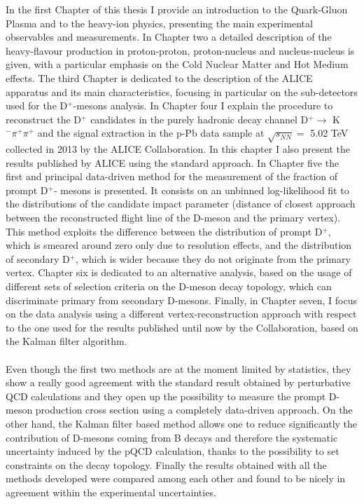 \documentclass[b5paper,10pt,twoside,oldstyle,classica]{toptesi}
\begin{document}
In the first Chapter of this thesis I provide an introduction to the Quark-Gluon Plasma and to the heavy-ion physics, presenting the main experimental observables and measurements. In Chapter two a detailed description of the heavy-flavour production in proton-proton, proton-nucleus and nucleus-nucleus is given, with a particular emphasis on the Cold Nuclear Matter and Hot Medium effects. The third Chapter is dedicated to the description of the ALICE apparatus and its main characteristics, focusing in particular on the sub-detectors used for the D$^+$-mesons analysis. In Chapter four I explain the procedure to reconstruct the D$^+$ candidates in the purely hadronic decay channel D$^+ \rightarrow$ K$^-\pi^+\pi^+$ and the signal extraction in the p-Pb data sample at $\sqrt{s_{NN}} =$ 5.02 TeV collected in 2013 by the ALICE Collaboration. In this chapter I also present the results published by ALICE using the standard approach. In Chapter five the first and principal data-driven method for the measurement of the fraction of prompt D$^+$- mesons is presented. It consists on an unbinned log-likelihood fit to the distributions of the candidate impact parameter (distance of closest approach between the reconstructed flight line of the D-meson and the primary vertex). This method exploits the difference between the distribution of prompt D$^+$, which is smeared around zero only due to resolution effects, and the distribution of secondary D$^+$, which is wider because they do not originate from the primary vertex. Chapter six is dedicated to an alternative analysis, based on the usage of different sets of selection criteria on the D-meson decay topology, which can discriminate primary from secondary D-mesons. Finally, in Chapter seven, I focus on the data analysis using a different vertex-reconstruction approach with respect to the one used for the results published until now by the Collaboration, based on the Kalman filter algorithm.\\\\
Even though the first two methods are at the moment limited by statistics, they show a really good agreement with the standard result obtained by perturbative QCD calculations and they open up the possibility to measure the prompt D-meson production cross section using a completely data-driven approach. On the other hand, the Kalman filter based method allows one to reduce significantly the contribution of D-mesons coming from B decays and therefore the systematic uncertainty induced by the pQCD calculation, thanks to the possibility to set constraints on the decay topology. Finally the results obtained with all the methods developed were compared among each other and found to be nicely in agreement within the experimental uncertainties.
\end{document}
